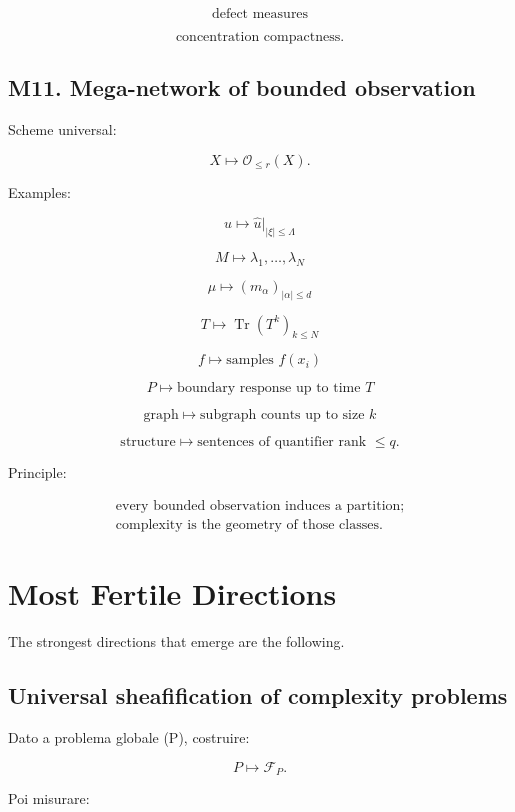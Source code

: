 \documentclass[11pt]{article}
\begin{document}
\[
\text{defect measures}
\]

\[
\text{concentration compactness}.
\]



\subsection{M11. Mega-network of bounded observation}

Scheme universal:

\[
X\mapsto \mathcal O_{\le r}(X).
\]

Examples:

\[
u\mapsto \widehat u|_{|\xi|\le \Lambda}
\]

\[
M\mapsto {\lambda_1,\ldots,\lambda_N}
\]

\[
\mu\mapsto (m_\alpha)_{|\alpha|\le d}
\]

\[
T\mapsto \operatorname{Tr}(T^k)_{k\le N}
\]

\[
f\mapsto \text{samples }f(x_i)
\]

\[
P\mapsto \text{boundary response up to time }T
\]

\[
\text{graph}\mapsto \text{subgraph counts up to size }k
\]

\[
\text{structure}\mapsto \text{sentences of quantifier rank }\le q.
\]

Principle:

\[
\boxed{
\begin{gathered}
\text{every bounded observation induces a partition;}\\
\text{complexity is the geometry of those classes.}
\end{gathered}
}
\]



\section{Most Fertile Directions}

The strongest directions that emerge are the following.



\subsection{Universal sheafification of complexity problems}

Dato a problema globale (P), costruire:

\[
P\mapsto \mathcal F_P.
\]

Poi misurare:
\end{document}
